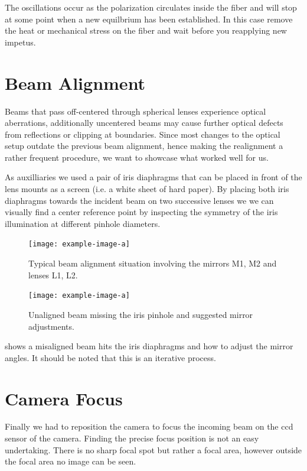 The oscillations occur as the polarization circulates inside the fiber and
will stop at some point when a new equilbrium has been established. In this
case remove the heat or mechanical stress on the fiber and wait before you
reapplying new impetus.

\section{Beam Alignment}

Beams that pass off-centered through spherical lenses experience optical
aberrations, additionally uncentered beams may cause further optical defects
from reflections or clipping at boundaries. Since most changes to the optical
setup outdate the previous beam alignment, hence making the realignment
a rather frequent procedure, we want to showcase what worked well for us.

As auxilliaries we used a pair of iris diaphragms that can be placed in front
of the lens mounts as a screen (i.e. a white sheet of hard paper). By placing
both iris diaphragms towards the incident beam on two successive lenses we
we can visually find a center reference point by inspecting the symmetry of
the iris illumination at different pinhole diameters.

\begin{figure}[ht]
  \centering
    \texttt{[image: example-image-a]}
    \caption{Typical beam alignment situation involving the mirrors M1, M2 and
    lenses L1, L2.}
    \label{fig:beamalign:setup}
  \endminipage
  \hfill
    \texttt{[image: example-image-a]}
    \caption{Unaligned beam missing the iris pinhole and suggested mirror
    adjustments.}
    \label{fig:beamalign:iris}
  \endminipage
  \hfill
\end{figure}

 shows a misaligned beam hits the iris diaphragms
and how to adjust the mirror angles. It should be noted that this is an
iterative process.

\section{Camera Focus}

Finally we had to reposition the camera to focus the incoming beam on the
\gls{ccd} sensor of the camera. Finding the precise focus position is not an
easy undertaking. There is no sharp focal spot but rather a focal area,
however outside the focal area no image can be seen.

